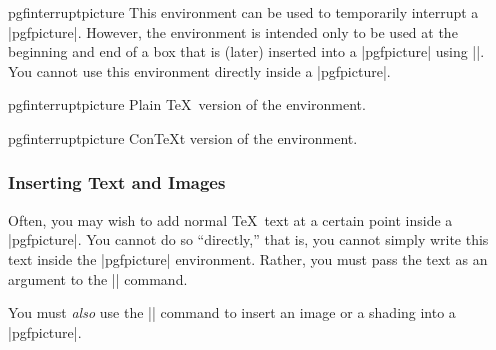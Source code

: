 \begin{environment}{{pgfinterruptpicture}}
  This environment can be used to temporarily interrupt a
  |{pgfpicture}|. However, the environment is intended only to be used
  at the beginning and end of a box that is (later) inserted into a
  |{pgfpicture}| using |\pgfqbox|. You cannot use this environment
  directly inside a |{pgfpicture}|.

\end{environment}

\begin{plainenvironment}{{pgfinterruptpicture}}
  Plain \TeX\ version of the environment.
\end{plainenvironment}

\begin{contextenvironment}{{pgfinterruptpicture}}
  Con\TeX t version of the environment.
\end{contextenvironment}


\subsubsection{Inserting Text and Images}

\label{section-text-command}

Often, you may wish to add normal \TeX\ text at a certain point inside
a |{pgfpicture}|. You cannot do so ``directly,'' that is, you cannot
simply write this text inside the |{pgfpicture}| environment. Rather,
you must pass the text as an argument to the |\pgftext| command.

You must \emph{also} use the |\pgftext| command to insert an image or
a shading into a |{pgfpicture}|.

